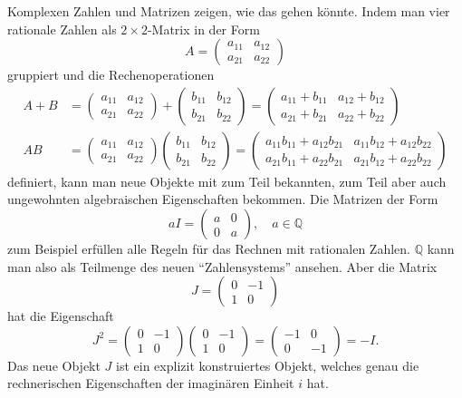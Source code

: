 Komplexen Zahlen und Matrizen zeigen, wie das gehen könnte.
Indem man vier rationale Zahlen als $2\times 2$-Matrix in der Form
\[
A=
\begin{pmatrix}
a_{11}&a_{12}\\
a_{21}&a_{22}
\end{pmatrix}
\]
gruppiert und die Rechenoperationen
\begin{align*}
A+B
&=
\begin{pmatrix}
a_{11}&a_{12}\\
a_{21}&a_{22}
\end{pmatrix}
+
\begin{pmatrix}
b_{11}&b_{12}\\
b_{21}&b_{22}
\end{pmatrix}
=
\begin{pmatrix}
a_{11}+b_{11}&a_{12}+b_{12}\\
a_{21}+b_{21}&a_{22}+b_{22}
\end{pmatrix}
\\
AB
&=
\begin{pmatrix}
a_{11}&a_{12}\\
a_{21}&a_{22}
\end{pmatrix}
\begin{pmatrix}
b_{11}&b_{12}\\
b_{21}&b_{22}
\end{pmatrix}
=
\begin{pmatrix}
a_{11}b_{11} + a_{12}b_{21} & a_{11}b_{12} + a_{12}b_{22} \\
a_{21}b_{11} + a_{22}b_{21} & a_{21}b_{12} + a_{22}b_{22}
\end{pmatrix}
\end{align*}
definiert, kann man neue Objekte mit zum Teil bekannten, zum Teil
aber auch ungewohnten algebraischen Eigenschaften bekommen.
Die Matrizen der Form
\[
aI
=
\begin{pmatrix} a&0\\0&a \end{pmatrix},
\quad
a\in\mathbb{Q}
\]
zum Beispiel erfüllen alle Regeln für das Rechnen mit rationalen Zahlen.
$\mathbb{Q}$ kann man also als Teilmenge des neuen ``Zahlensystems'' ansehen.
Aber die Matrix
\[
J
=
\begin{pmatrix} 0&-1\\1&0 \end{pmatrix}
\]
hat die Eigenschaft
\[
J^2 = 
\begin{pmatrix} 0&-1\\1&0 \end{pmatrix}
\begin{pmatrix} 0&-1\\1&0 \end{pmatrix}
=
\begin{pmatrix} -1&0\\0&-1\end{pmatrix}
=
-I.
\]
Das neue Objekt $J$ ist ein explizit konstruiertes Objekt, welches
genau die rechnerischen Eigenschaften der imaginären Einheit $i$ hat.

